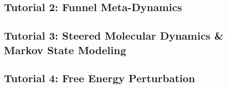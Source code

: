 \documentclass[9pt,tutorial]{livecoms}
\begin{document}
\subsection{Tutorial 2: Funnel Meta-Dynamics}

\subsection{Tutorial 3: Steered Molecular Dynamics \& Markov State Modeling}

\subsection{Tutorial 4: Free Energy Perturbation}


%
%

%
\end{document}
